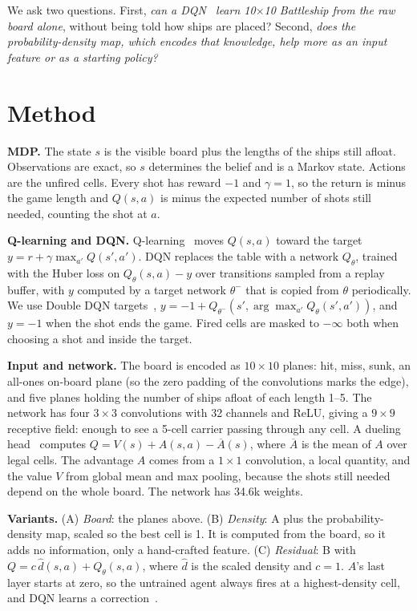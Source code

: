\documentclass[conference,10pt]{IEEEtran}
\begin{document}
We ask two questions. First, \emph{can a DQN~\cite{mnih2015} learn 10$\times$10
Battleship from the raw board alone}, without being told how ships are placed?
Second, \emph{does the probability-density map, which encodes that knowledge,
help more as an input feature or as a starting policy?}

\section{Method}
\textbf{MDP.} The state $s$ is the visible board plus the lengths of the ships
still afloat. Observations are exact, so $s$ determines the belief and is a
Markov state. Actions are the unfired cells. Every shot has reward $-1$ and
$\gamma=1$, so the return is minus the game length and $Q(s,a)$ is minus the
expected number of shots still needed, counting the shot at $a$.

\textbf{Q-learning and DQN.} Q-learning~\cite{watkins1992} moves $Q(s,a)$
toward the target $y=r+\gamma\max_{a'}Q(s',a')$. DQN replaces the table with a
network $Q_\theta$, trained with the Huber loss on $Q_\theta(s,a)-y$ over
transitions sampled from a replay buffer, with $y$ computed by a target network
$\theta^-$ that is copied from $\theta$ periodically. We use Double DQN
targets~\cite{vanhasselt2016}, $y=-1+Q_{\theta^-}(s',\arg\max_{a'}Q_\theta(s',a'))$,
and $y=-1$ when the shot ends the game. Fired cells are masked to $-\infty$ both
when choosing a shot and inside the target.

\textbf{Input and network.} The board is encoded as $10\times10$ planes: hit,
miss, sunk, an all-ones on-board plane (so the zero padding of the convolutions
marks the edge), and five planes holding the number of ships afloat of each
length 1--5. The network has four $3\times3$ convolutions with 32 channels and
ReLU, giving a $9\times9$ receptive field: enough to see a 5-cell carrier passing
through any cell. A dueling head~\cite{wang2016} computes
$Q=V(s)+A(s,a)-\overline{A}(s)$, where $\overline{A}$ is the mean of $A$ over
legal cells. The advantage $A$ comes from a $1\times1$ convolution, a local
quantity, and the value $V$ from global mean and max pooling, because the shots
still needed depend on the whole board. The network has 34.6k weights.

\textbf{Variants.} (A) \emph{Board}: the planes above. (B) \emph{Density}: A plus
the probability-density map, scaled so the best cell is 1. It is computed from
the board, so it adds no information, only a hand-crafted feature. (C)
\emph{Residual}: B with $Q=c\,\hat d(s,a)+Q_\theta(s,a)$, where $\hat d$ is the
scaled density and $c=1$. $A$'s last layer starts at zero, so the untrained agent
always fires at a highest-density cell, and DQN learns a
correction~\cite{johannink2019}.
\end{document}
